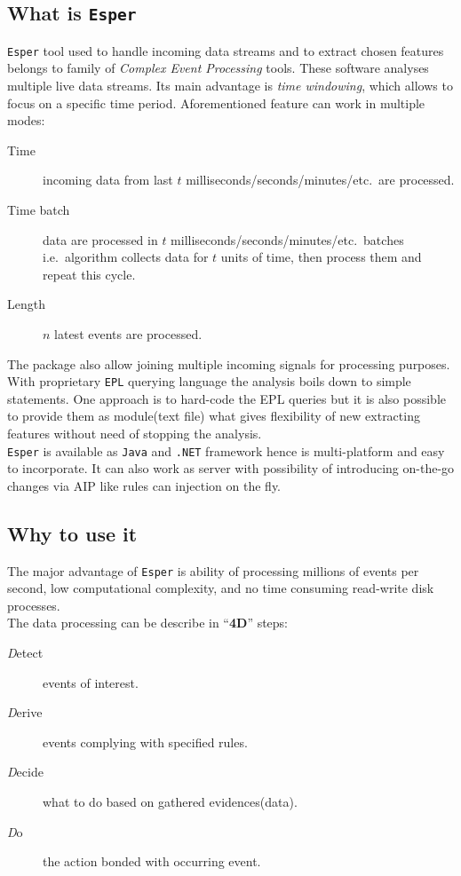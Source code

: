 \documentclass[11pt, letterpaper]{article}            %
\begin{document}
\subsection{What is \texttt{Esper}}
\texttt{Esper} tool used to handle incoming data streams and to extract chosen features belongs to family of \emph{Complex Event Processing} tools. These software analyses multiple live data streams. Its main advantage is \emph{time windowing}, which allows to focus on a specific time period. Aforementioned feature can work in multiple modes:
\begin{description}
    \item[Time] incoming data from last $t$ milliseconds/seconds/minutes/etc.\ are processed.
    \item[Time batch] data are processed in $t$ milliseconds/seconds/minutes/etc.\ batches i.e.\ algorithm collects data for $t$ units of time, then process them and repeat this cycle.
    \item[Length] $n$ latest events are processed.
\end{description}
The package also allow joining multiple incoming signals for processing purposes. With proprietary \texttt{EPL} querying language the analysis boils down to simple statements. One approach is to hard-code the EPL queries but it is also possible to provide them as module(text file) what gives flexibility of new extracting features without need of stopping the analysis.\\
\texttt{Esper} is available as \texttt{Java} and \texttt{.NET} framework hence is multi-platform and easy to incorporate. It can also work as server with possibility of introducing on-the-go changes via AIP like rules can injection on the fly.\\

\subsection{Why to use it}
The major advantage of \texttt{Esper} is ability of processing millions of events per second, low computational complexity, and no time consuming read-write disk processes.\\
The data processing can be describe in ``\textbf{4D}'' steps:
\begin{description}
\item[\textit{D}etect] events of interest.
\item [\textit{D}erive] events complying with specified rules.
\item [\textit{D}ecide] what to do based on gathered evidences(data).
\item [\textit{D}o] the action bonded with occurring event.
\end{description}
\end{document}
